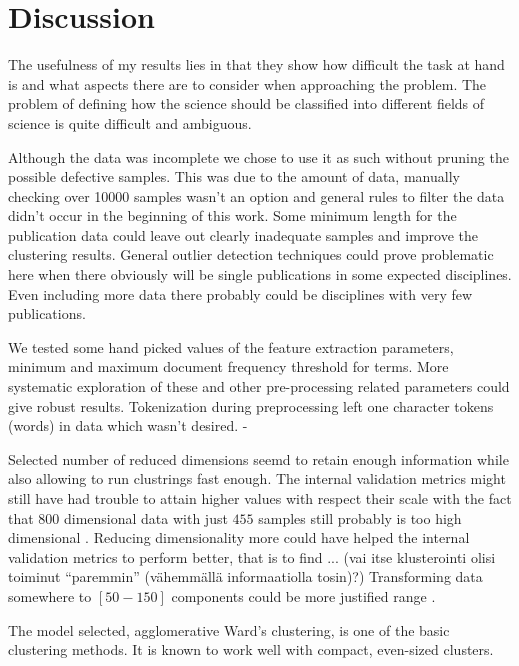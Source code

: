 \chapter{Discussion}
\label{chapter:discussion}

The usefulness of my results lies in that they show how difficult
the task at hand is and what aspects there are to consider when
approaching the problem.
The problem of defining how the science should be classified into
different fields of science is quite difficult and ambiguous.

Although the data was incomplete we chose to use it as such without 
pruning the possible defective samples. This was due to the 
amount of data, manually checking over 10000 samples wasn't an 
option and general rules to filter the data didn't occur in the
beginning of this work. Some minimum length for the publication 
data could leave out clearly inadequate samples and improve the 
clustering results. General outlier detection techniques 
\cite{hodge_survey_2004} could prove 
problematic here when there obviously will be single publications 
in some expected disciplines. Even including more data there
probably could be disciplines with very few publications.

We tested some hand picked values of the feature extraction 
parameters, minimum and maximum document frequency threshold for 
terms. More systematic exploration of these and other 
pre-processing related parameters could give robust results.
Tokenization during preprocessing left one character tokens (words)
in data which wasn't desired.
- 

Selected number of reduced dimensions seemd to retain enough
information while also allowing to run clustrings fast enough.
The internal validation metrics might still have had trouble to 
attain higher values with respect their scale with the fact that 
$800$ dimensional data with just $455$ samples still probably is 
too high dimensional \cite{aggarwal_surprising_2001}. 
Reducing dimensionality more could have helped the internal 
validation metrics to perform better, that is to find ... (vai 
itse klusterointi olisi toiminut ``paremmin'' (vähemmällä informaatiolla tosin)?)
Transforming data somewhere to $[50-150]$ components could be more
justified range \cite{dolnicar_review_2002}. 

The model selected, agglomerative Ward's clustering, is one of the
basic clustering methods. It is known to work well with compact,
even-sized clusters.

